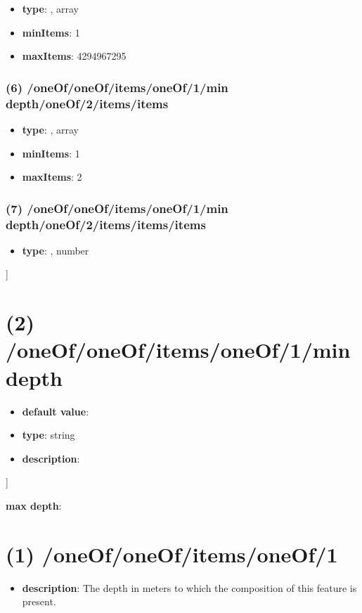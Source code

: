 \begin{itemize}[leftmargin=5em]\item {\bf type}: , array\item {\bf minItems}: 1
\item {\bf maxItems}: 4294967295
\end{itemize}\subsubsection{(6) /oneOf/oneOf/items/oneOf/1/min depth/oneOf/2/items/items}
\begin{itemize}[leftmargin=6em]\item {\bf type}: , array\item {\bf minItems}: 1
\item {\bf maxItems}: 2
\end{itemize}\subsubsection{(7) /oneOf/oneOf/items/oneOf/1/min depth/oneOf/2/items/items/items}
\begin{itemize}[leftmargin=7em]\item {\bf type}: , number\end{itemize}]\section{(2) /oneOf/oneOf/items/oneOf/1/min depth}
\begin{itemize}[leftmargin=2em]\item {\bf default value}: 
\item {\bf type}: string
\item {\bf description}: 
\end{itemize}]\item {\bf max depth}: \section{(1) /oneOf/oneOf/items/oneOf/1}
\begin{itemize}[leftmargin=1em]\item {\bf description}: The depth in meters to which the composition of this feature is present.
\end{itemize}
